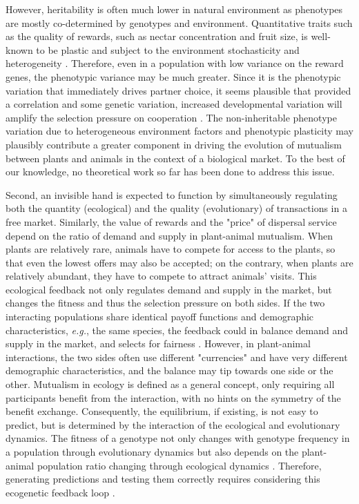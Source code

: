 \documentclass[12pt]{article}
\begin{document}
However, heritability is often much lower in natural environment as phenotypes are mostly co-determined by genotypes and environment. Quantitative traits such as the quality of rewards, such as nectar concentration and fruit size, is well-known to be plastic and subject to the environment stochasticity and heterogeneity \citep{Sultan2000}. Therefore, even in a population with low variance on the reward genes, the phenotypic variance may be much greater. Since it is the phenotypic variation that immediately drives partner choice, it seems plausible that provided a correlation and some genetic variation, increased developmental variation will amplify the selection pressure on cooperation \citep{McNamara.Leimar2010}. The non-inheritable phenotype variation due to heterogeneous environment factors and phenotypic plasticity may plausibly contribute a greater component in driving the evolution of mutualism between plants and animals in the context of a biological market. To the best of our knowledge, no theoretical work so far has been done to address this issue.

Second, an invisible hand is expected to function by simultaneously regulating both the quantity (ecological) and the quality (evolutionary) of transactions in a free market. Similarly, the value of rewards and the "price" of dispersal service depend on the ratio of demand and supply in plant-animal mutualism. When plants are relatively rare, animals have to compete for access to the plants, so that even the lowest offers may also be accepted; on the contrary, when plants are relatively abundant, they have to compete to attract animals' visits. This ecological feedback not only regulates demand and supply in the market, but changes the fitness and thus the selection pressure on both sides. If the two interacting populations share identical payoff functions and demographic characteristics, \textit{e.g.}, the same species, the feedback could in balance demand and supply in the market, and selects for fairness  \citep{Andre.Baumard2011}. However, in plant-animal interactions, the two sides often use different "currencies" and have very different demographic characteristics, and the balance may tip towards one side or the other. Mutualism in ecology is defined as a general concept, only requiring all participants benefit from the interaction, with no hints on the symmetry of the benefit exchange. Consequently, the equilibrium, if existing, is not easy to predict, but is determined by the interaction of the ecological and evolutionary dynamics. The fitness of a genotype not only changes with genotype frequency in a population through evolutionary dynamics but also depends on the plant-animal population ratio changing through ecological dynamics \citep{Holland.etal2004}. Therefore, generating predictions and testing them correctly requires considering this ecogenetic feedback loop \citep{Kokko.Lopez-Sepulcre2007}.
\end{document}
